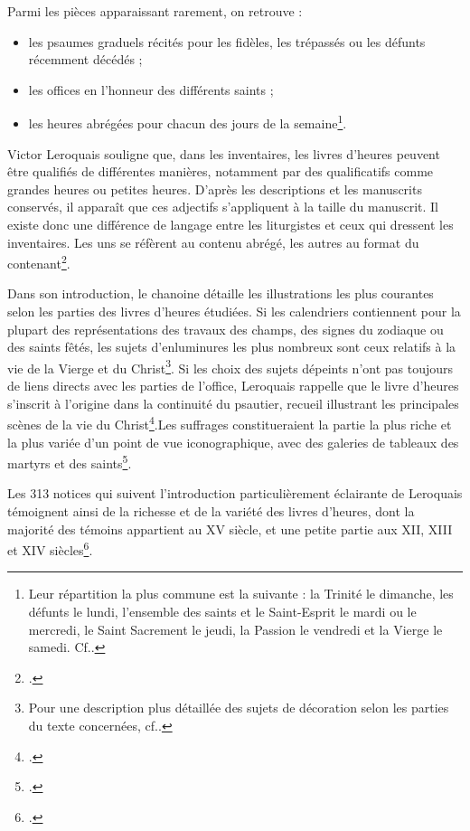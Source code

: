 \documentclass[a4paper,12pt,twoside]{book}
\begin{document}
	
Parmi les pièces apparaissant rarement, on retrouve :
\begin{itemize}
    \item les psaumes graduels récités pour les fidèles, les trépassés ou les défunts récemment décédés ;
    \item les offices en l'honneur des différents saints ;
    \item les heures abrégées pour chacun des jours de la semaine\footnote{Leur répartition la plus commune est la suivante : la Trinité le dimanche, les défunts le lundi, l'ensemble des saints et le Saint-Esprit le mardi ou le mercredi, le Saint Sacrement le jeudi, la Passion le vendredi et la Vierge le samedi. Cf.\cite[p. XXVIII]{Leroquais_notices}.}.
\end{itemize}
	
	Victor Leroquais souligne que, dans les inventaires, les livres d'heures peuvent être qualifiés de différentes manières, notamment par des qualificatifs comme \og{}grandes heures\fg{} ou \og{}petites heures\fg{}. D'après les descriptions et les manuscrits conservés, il apparaît que ces adjectifs s'appliquent à la taille du manuscrit. Il existe donc une différence de langage entre les liturgistes et ceux qui dressent les inventaires. Les uns se réfèrent au contenu abrégé, les autres au format du contenant\footcite[p. XX]{Leroquais_notices}. 
	
	Dans son introduction, le chanoine détaille les illustrations les plus courantes selon les parties des livres d'heures étudiées. Si les calendriers contiennent pour la plupart des représentations des travaux des champs, des signes du zodiaque ou des saints fêtés, les sujets d'enluminures les plus nombreux sont ceux relatifs à la vie de la Vierge et du Christ\footnote {Pour une description plus détaillée des sujets de décoration selon les parties du texte concernées, cf.\cite[p. XLIII-LXXXIV]{Leroquais_notices}.}. Si les choix des sujets dépeints n'ont pas toujours de liens directs avec les parties de l'office, Leroquais rappelle que le livre d'heures s'inscrit à l'origine dans la continuité du psautier, recueil illustrant les principales scènes de la vie du Christ\footcite[p. XLIV]{Leroquais_notices}.Les suffrages constitueraient la partie la plus riche et la plus variée d'un point de vue iconographique, avec des galeries de tableaux des martyrs et des saints\footcite[p. XLVIII]{Leroquais_notices}.
	
	Les 313 notices qui suivent l'introduction particulièrement éclairante de Leroquais témoignent ainsi de la richesse et de la variété des livres d'heures, dont la majorité des témoins appartient au \textsc{XV} siècle, et une petite partie aux \textsc{XII}, \textsc{XIII} et \textsc{XIV} siècles\footcite[p. LXXXIV]{Leroquais_notices}. \\
	
\end{document}
